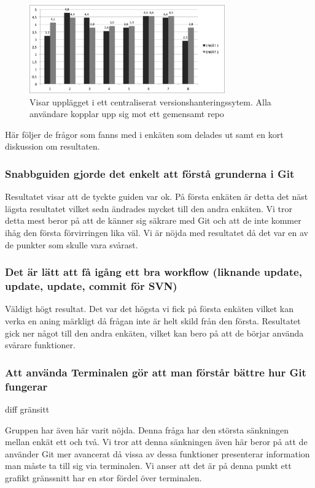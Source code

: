 \begin{figure}[htb!]\centering\includegraphics[width=0.75\textwidth]{EnkatResultatMindre.png}\caption{Visar upplägget i ett centraliserat versionshanteringssytem. Alla användare kopplar upp sig mot ett gemensamt repo}\label{fig:enkat}\end{figure}

Här följer de frågor som fanns med i enkäten som delades ut samt en kort diskussion om resultaten.

\subsubsection{Snabbguiden gjorde det enkelt att förstå grunderna i Git}

Resultatet visar att de tyckte guiden var ok. På första enkäten är detta det näst lägsta resultatet vilket sedn ändrades mycket till den andra enkäten. Vi tror detta mest beror på att de känner sig säkrare med Git och att de inte kommer ihåg den första förvirringen lika väl. Vi är nöjda med resultatet då det var en av de punkter som skulle vara svårast.

\subsubsection{Det är lätt att få igång ett bra workflow (liknande update, update, update, commit för SVN)}

Väldigt högt resultat. Det var det högsta vi fick på första enkäten vilket kan verka en aning märkligt då frågan inte är helt skild från den första. Resultatet gick ner något till den andra enkäten, vilket kan bero på att de börjar använda svårare funktioner. 

\subsubsection{Att använda Terminalen gör att man förstår bättre hur Git fungerar}
diff gränsitt

Gruppen har även här varit nöjda. Denna fråga har den största sänkningen mellan enkät ett och två. Vi tror att denna sänkningen även här beror på att de använder Git mer avancerat då vissa av dessa funktioner presenterar information man måste ta till sig via terminalen. Vi anser att det är på denna punkt ett grafikt gränssnitt har en stor fördel över terminalen. 

